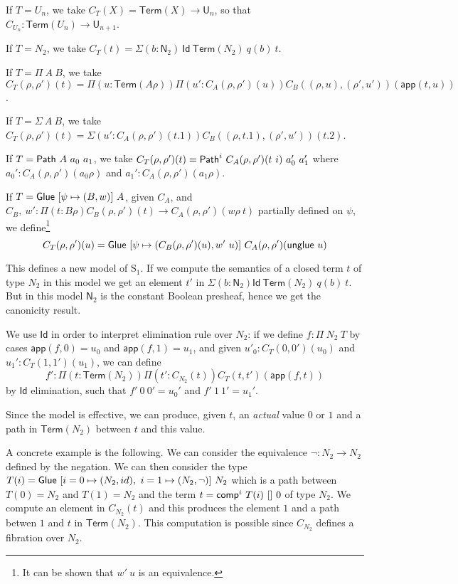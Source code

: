 \documentclass[10pt,a4paper]{article}
\newcommand{\Id}{\mathsf{Id}}
\newcommand{\Path}{{\sf Path}}
\def\NN{\mathsf{N}}
\def\UU{\mathsf{U}}
\def\Term{\mathsf{Term}}
\newcommand{\app}{\mathsf{app}}
\newcommand{\Elem}{\mathsf{Term}}
\newcommand{\comp}{{\sf comp}}
\newcommand{\Glue}{{\sf Glue}}
\newcommand{\unglue}{{\sf unglue}}
\begin{document}
 If $T = U_n$, we take $C_{T}(X) = \Term(X)\rightarrow \UU_n$, so that $C_{U_n}:\Term(U_n)\rightarrow \UU_{n+1}$.

\medskip

 If $T = N_2$, we take $C_{T}(t) = \Sigma (b:\NN_2)~\Id~\Term(N_2)~q(b)~t$.

\medskip

 If $T = \Pi~A~B$, we take 
$C_{T}(\rho,\rho')(t) = \Pi (u:\Term(A\rho))\Pi (u':C_A(\rho,\rho')(u))C_B((\rho,u),(\rho',u'))(\app(t,u))$.

\medskip

 If $T = \Sigma~A~B$, we take $C_{T}(\rho,\rho')(t) = \Sigma (u':C_A(\rho,\rho')(t.1))C_B((\rho,t.1),(\rho',u'))(t.2)$.

\medskip

 If $T = \Path~A~a_0~a_1$, we take $C_{T}(\rho,\rho')(t) = \Path^i~C_A(\rho,\rho')(t~i)~a_0'~a_1'$ where 
$a_0':C_A(\rho,\rho')(a_0\rho)$ and $a_1':C_A(\rho,\rho')(a_1\rho)$.

\medskip

 If $T = \Glue~[\psi\mapsto (B,w)]~A$, given $C_A$, and 
$C_B,~w':\Pi (t:B\rho)C_B(\rho,\rho')(t)\rightarrow C_A(\rho,\rho')(w\rho~t)$ partially defined on $\psi$,
we define\footnote{It can be shown that $w'~u$ is an equivalence.}
$$C_{T}(\rho,\rho')(u) = \Glue~[\psi\mapsto (C_B(\rho,\rho')(u),w'~u)]~C_A(\rho,\rho')(\unglue~u)$$

\medskip

 This defines a new model of S$_1$. If we compute the semantics of a closed term $t$
of type $N_2$ in this model we get an element $t'$ in $\Sigma (b:\NN_2)\Id~\Term(N_2)~q(b)~t$.
But in this model $\NN_2$ is the constant Boolean presheaf, hence we get the canonicity result.

\medskip

 We use $\Id$ in order to interpret elimination rule over $N_2$: if we define $f:\Pi~N_2~T$
by cases $\app(f,0) = u_0$ and $\app(f,1) = u_1$, and given $u'_0:C_T(0,0')(u_0)$
and $u_1':C_T(1,1')(u_1)$, we can define 
$$f':\Pi (t:\Elem(N_2))\Pi (t':C_{N_2}(t))C_T(t,t')(\app(f,t))$$
by $\Id$ elimination, such that $f'~0~0' = u_0'$ and $f'~1~1' = u_1'$.


\medskip

 Since the model is effective, we can produce, given $t$, an {\em actual} value $0$ or $1$ and
a path in $\Term(N_2)$ between $t$ and this value. 

 A concrete example is the following. We can consider the equivalence $\neg:N_2\rightarrow N_2$
defined by the negation.
We can then consider the type $T(i) = \Glue~[i=0\mapsto (N_2,id),~i=1\mapsto (N_2,\neg)]~N_2$
which is a path between $T(0) = N_2$ and $T(1) = N_2$
and the term $t = \comp^i~T(i)~[]~0$ of type $N_2$. We compute an element in $C_{N_2}(t)$ and
this produces the element $1$ and a path betwen $1$ and $t$ in $\Term(N_2)$.
This computation is possible since $C_{N_2}$ defines a fibration over $N_2$.
\end{document}
